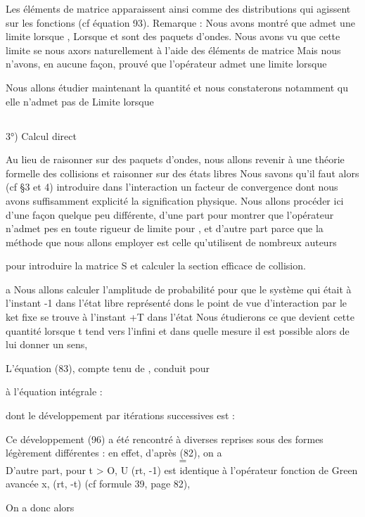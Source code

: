 Les éléments de matrice  apparaissent ainsi comme des distributions
qui agissent sur les fonctions (cf équation 93).
Remarque : 
Nous avons montré que  admet une limite lorsque
, Lorsque  et  sont des paquets d'ondes.
Nous avons vu que cette limite se nous axors naturellement à l'aide
des éléments de matrice
Mais nous n'avons, en aucune façon, prouvé que l'opérateur 
admet une limite lorsque 

Nous allons étudier maintenant la quantité
et nous constaterons notamment qu elle n'admet pas de Limite lorsque

\subsection{}%
3°) Calcul direct 

Au lieu de raisonner sur des paquets d'ondes, nous allons revenir
à une théorie formelle des collisions et raisonner sur des états libres
Nous savons qu'il faut alors (cf \S 3 et 4) introduire dans l'interaction un
facteur de convergence dont nous avons suffisamment explicité la signification
physique. Nous allons procéder ici d'une façon quelque peu différente,
d'une part pour montrer que l'opérateur  n'admet pes en toute rigueur de limite
pour , et d'autre part parce que la
méthode que nous allons employer est celle qu'utilisent de nombreux auteurs

pour introduire la matrice S et calculer la section efficace de collision.


a Nous allons calculer l'amplitude de probabilité
 pour que le système qui était à l'instant -1 dans l'état libre représenté dons
 le point de vue d'interaction par le ket fixe  se trouve à l'instant +T dans
l'état Nous étudierons ce que devient cette quantité lorsque t tend vers
l'infini et dans quelle mesure il est possible alors
de lui donner un sens,

L'équation (83), compte tenu de , conduit pour

%
 à l'équation intégrale :

dont le développement par itérations successives est :

Ce développement (96) a été rencontré à diverses reprises sous des
formes légèrement différentes : en effet, d'après (82), on a
\[
\tag{97}=
\]
D'autre part, pour t > O, U (rt, -1) est identique à l'opérateur
fonction de Green avancée x, (rt, -t) (cf formule 39, page 82),

On a donc alors

